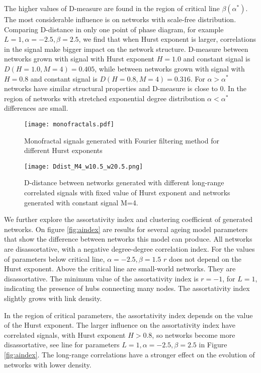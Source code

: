 The higher values of D-measure are found in the region of critical line $\beta(\alpha^{*})$. The most considerable influence is on networks with scale-free distribution. Comparing D-distance in only one point of  phase diagram, for example $L=1, \alpha = -2.5, \beta = 2.5$, we find that when Hurst exponent is larger, correlations in the signal make bigger impact on the network structure. D-measure between networks grown with signal with Hurst exponent $H=1.0$ and constant signal is $D(H=1.0, M=4) = 0.405$, while between networks grown with signal with $H=0.8$ and constant signal is $D(H=0.8, M=4) = 0.316$. For $\alpha>\alpha^{*}$ networks have similar structural properties and D-measure is close to 0. In the region of networks with stretched exponential degree distribution $\alpha<\alpha^{*}$  differences are small. 

\begin{figure}[H]
	\centering
	\texttt{[image: monofractals.pdf]}
	\caption{Monofractal signals generated with Fourier filtering method for different Hurst exponents}
	\label{fig:monofractals}
\end{figure}

\begin{figure}[H]
	\centering
	\texttt{[image: Ddist\_M4\_w10.5\_w20.5.png]}
	\caption{D-distance between networks generated with different long-range correlated signals with fixed value of Hurst exponent and networks generated with constant signal M=4.}
	\label{fig:Ddist_m}
\end{figure}


We further explore the assortativity index and clustering coefficient of generated networks. On figure \ref{fig:aindex} are results for several ageing model parameters that show the difference between networks this model can produce. All networks are disassortative, with a negative degree-degree correlation index. For the values of parameters below critical line, $\alpha=-2.5, \beta=1.5$ $r$ does not depend on the Hurst exponent. Above the critical line are small-world networks. They are disassortative. The minimum value of the assortativity index is $r =-1$, for $L=1$, indicating the presence of hubs connecting many nodes. The assortativity index slightly grows with link density. 

In the region of critical parameters, the assortativity index depends on the value of the Hurst exponent. The larger influence on the assortativity index have correlated signals, with Hurst exponent $H>0.8$, so networks become more disassortative, see line for parameters $L=1, \alpha=-2.5, \beta=2.5$ in Figure \ref{fig:aindex}. The long-range correlations have a stronger effect on the evolution of networks with lower density. 

